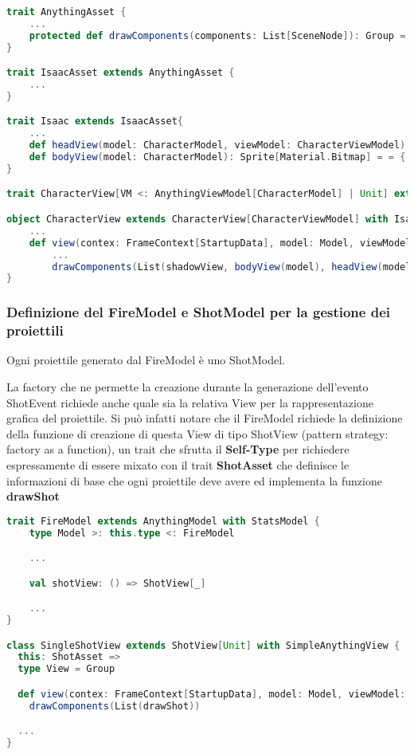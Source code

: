 \begin{lstlisting}[language=Scala]
trait AnythingAsset {
	...
	protected def drawComponents(components: List[SceneNode]): Group = ...
}

trait IsaacAsset extends AnythingAsset {
  	...
}

trait Isaac extends IsaacAsset{
	...
	def headView(model: CharacterModel, viewModel: CharacterViewModel): Graphic[Material.Bitmap] = {...}
	def bodyView(model: CharacterModel): Sprite[Material.Bitmap] = = {...}
}

trait CharacterView[VM <: AnythingViewModel[CharacterModel] | Unit] extends AnythingView[CharacterModel, VM] {}

object CharacterView extends CharacterView[CharacterViewModel] with Isaac {
	...
	def view(contex: FrameContext[StartupData], model: Model, viewModel: ViewModel): View =
		...
		drawComponents(List(shadowView, bodyView(model), headView(model, viewModel)))
}
\end{lstlisting}	

\subsubsection{Definizione del FireModel e ShotModel per la gestione dei proiettili}
Ogni proiettile generato dal FireModel è uno ShotModel.

La factory che ne permette la creazione durante la generazione dell'evento ShotEvent 
richiede anche quale sia la relativa View per la rappresentazione grafica del proiettile.
Si può infatti notare che il FireModel richiede la definizione della funzione di creazione di questa View di tipo ShotView (pattern strategy: factory as a function), un trait che sfrutta il \textbf{Self-Type} per richiedere espressamente di essere mixato 
con il trait \textbf{ShotAsset} che definisce le informazioni di base che ogni proiettile deve avere ed implementa la funzione \textbf{drawShot}

\begin{lstlisting}[language=Scala]
trait FireModel extends AnythingModel with StatsModel {
  	type Model >: this.type <: FireModel

	...

  	val shotView: () => ShotView[_]

  	...
}

class SingleShotView extends ShotView[Unit] with SimpleAnythingView {
  this: ShotAsset =>
  type View = Group

  def view(contex: FrameContext[StartupData], model: Model, viewModel: ViewModel): View =
    drawComponents(List(drawShot))

  ...
}
\end{lstlisting}

